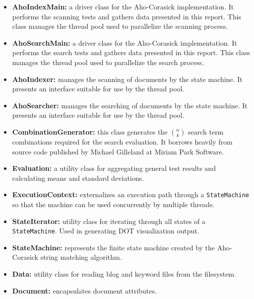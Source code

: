 \documentclass[10pt]{report}
\begin{document}
\begin{itemize}
\item \textbf{AhoIndexMain:} a driver class for the Aho-Corasick
  implementation. It performs the scanning tests and gathers data
  presented in this report. This class manages the thread pool used to
  parallelize the scanning process.

\item \textbf{AhoSearchMain:} a driver class for the Aho-Corasick
  implementation. It performs the search tests and gathers data
  presented in this report. This class manages the thread pool used to
  parallelize the search process.

\item \textbf{AhoIndexer:} manages the scanning of documents by the
  state machine. It presents an interface suitable for use by the
  thread pool.

\item \textbf{AhoSearcher:} manages the searching of documents by the
  state machine. It presents an interface suitable for use by the
  thread pool.

\item \textbf{CombinationGenerator:} this class generates the ${n
  \choose k}$ search term combinations required for the search
  evaluation. It borrows heavily from source code published by Michael
  Gilleland at Miriam Park Software.

\item \textbf{Evaluation:} a utility class for aggregating general
  test results and calculating means and standard deviations.

\item \textbf{ExecutionContext:} externalizes an execution path
  through a \texttt{StateMachine} so that the machine can be used
  concurrently by multiple threads.

\item \textbf{StateIterator:} utility class for iterating through all
  states of a \texttt{StateMachine}. Used in generating DOT
  visualization output.

\item \textbf{StateMachine:} represents the finite state machine
  created by the Aho-Corasick string matching
  algorithm\cite{RefWorks:103}.

\item \textbf{Data:} utility class for reading blog and keyword files
  from the filesystem.

\item \textbf{Document:} encapsulates document attributes.


\end{itemize}
\end{document}
